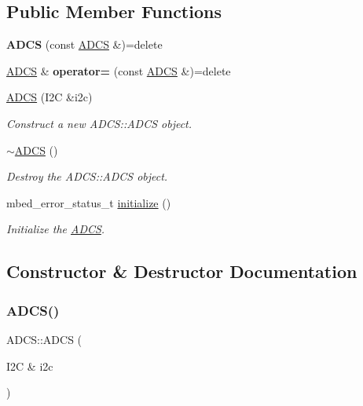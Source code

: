 \subsection*{Public Member Functions}
\begin{DoxyCompactItemize}
\item 
\mbox{\label{class_a_d_c_s_ae19621431053c4e7a4e17e57dc3dbae9}} 
{\bfseries A\+D\+CS} (const \mbox{\hyperlink{class_a_d_c_s}{A\+D\+CS}} \&)=delete
\item 
\mbox{\label{class_a_d_c_s_ae65c7332f0f24d24b251fe3e5a537bbe}} 
\mbox{\hyperlink{class_a_d_c_s}{A\+D\+CS}} \& {\bfseries operator=} (const \mbox{\hyperlink{class_a_d_c_s}{A\+D\+CS}} \&)=delete
\item 
\mbox{\hyperlink{class_a_d_c_s_ac25de50b23a20e173b0e4ea0d7df7f04}{A\+D\+CS}} (I2C \&i2c)
\begin{DoxyCompactList}\small\item\em Construct a new A\+D\+C\+S\+::\+A\+D\+CS object. \end{DoxyCompactList}\item 
\mbox{\hyperlink{class_a_d_c_s_a64926eda19fc2e58876c62616ab0b068}{$\sim$\+A\+D\+CS}} ()
\begin{DoxyCompactList}\small\item\em Destroy the A\+D\+C\+S\+::\+A\+D\+CS object. \end{DoxyCompactList}\item 
mbed\+\_\+error\+\_\+status\+\_\+t \mbox{\hyperlink{class_a_d_c_s_a5a4196a5298a2e804ee85f2965b31133}{initialize}} ()
\begin{DoxyCompactList}\small\item\em Initialize the \mbox{\hyperlink{class_a_d_c_s}{A\+D\+CS}}. \end{DoxyCompactList}\end{DoxyCompactItemize}


\subsection{Constructor \& Destructor Documentation}
\mbox{\label{class_a_d_c_s_ac25de50b23a20e173b0e4ea0d7df7f04}} 
\subsubsection{\texorpdfstring{ADCS()}{ADCS()}}
{\footnotesize\ttfamily A\+D\+C\+S\+::\+A\+D\+CS (\begin{DoxyParamCaption}\item[{I2C \&}]{i2c }\end{DoxyParamCaption})}



